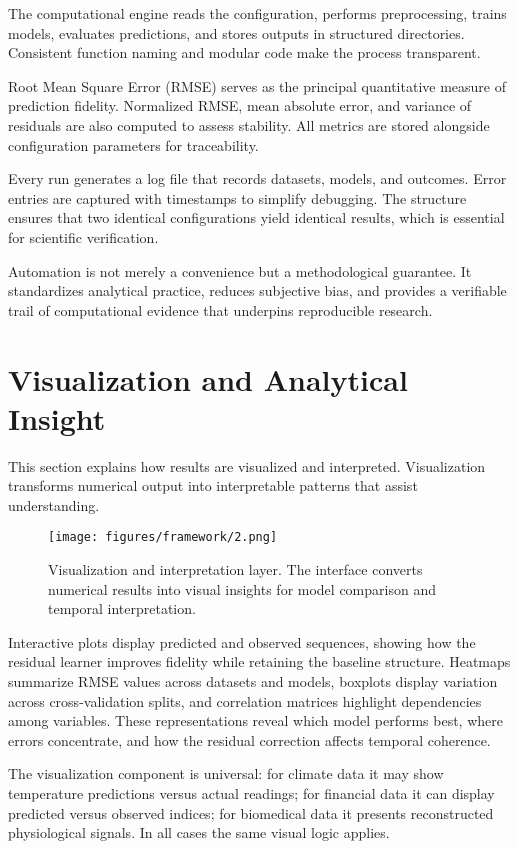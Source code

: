  The computational engine reads the configuration, performs preprocessing, trains models, evaluates predictions, and stores outputs in structured directories. Consistent function naming and modular code make the process transparent.

 Root Mean Square Error (RMSE) serves as the principal quantitative measure of prediction fidelity. Normalized RMSE, mean absolute error, and variance of residuals are also computed to assess stability. All metrics are stored alongside configuration parameters for traceability.

 Every run generates a log file that records datasets, models, and outcomes. Error entries are captured with timestamps to simplify debugging. The structure ensures that two identical configurations yield identical results, which is essential for scientific verification.

Automation is not merely a convenience but a methodological guarantee. It standardizes analytical practice, reduces subjective bias, and provides a verifiable trail of computational evidence that underpins reproducible research.

\section{Visualization and Analytical Insight}

This section explains how results are visualized and interpreted. Visualization transforms numerical output into interpretable patterns that assist understanding.

\begin{figure}[htbp]
\centering
\texttt{[image: figures/framework/2.png]}
\caption{Visualization and interpretation layer. The interface converts numerical results into visual insights for model comparison and temporal interpretation.}
\label{fig:visualization_general}
\end{figure}

Interactive plots display predicted and observed sequences, showing how the residual learner improves fidelity while retaining the baseline structure. Heatmaps summarize RMSE values across datasets and models, boxplots display variation across cross-validation splits, and correlation matrices highlight dependencies among variables. These representations reveal which model performs best, where errors concentrate, and how the residual correction affects temporal coherence.

The visualization component is universal: for climate data it may show temperature predictions versus actual readings; for financial data it can display predicted versus observed indices; for biomedical data it presents reconstructed physiological signals. In all cases the same visual logic applies.

